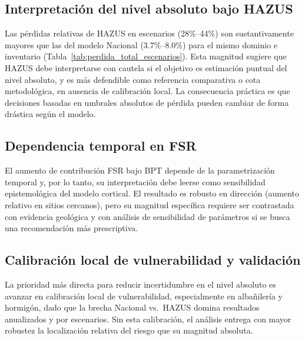 \subsection{Interpretación del nivel absoluto bajo HAZUS}
\label{subsubsec:lim_hazus}

Las pérdidas relativas de HAZUS en escenarios (28\%--44\%) son sustantivamente mayores que las del modelo Nacional (3.7\%--8.0\%) para el mismo dominio e inventario (Tabla~\ref{tab:perdida_total_escenarios}). Esta magnitud sugiere que HAZUS debe interpretarse con cautela si el objetivo es estimación puntual del nivel absoluto, y es más defendible como referencia comparativa o cota metodológica, en ausencia de calibración local. La consecuencia práctica es que decisiones basadas en umbrales absolutos de pérdida pueden cambiar de forma drástica según el modelo.

\subsection{Dependencia temporal en FSR}
\label{subsubsec:lim_bpt}

El aumento de contribución FSR bajo BPT depende de la parametrización temporal y, por lo tanto, su interpretación debe leerse como sensibilidad epistemológica del modelo cortical. El resultado es robusto en dirección (aumento relativo en sitios cercanos), pero su magnitud específica requiere ser contrastada con evidencia geológica y con análisis de sensibilidad de parámetros si se busca una recomendación más prescriptiva.


\subsection{Calibración local de vulnerabilidad y validación}
\label{subsubsec:proj_vuln}

La prioridad más directa para reducir incertidumbre en el nivel absoluto es avanzar en calibración local de vulnerabilidad, especialmente en albañilería y hormigón, dado que la brecha Nacional vs.\ HAZUS domina resultados anualizados y por escenarios. Sin esta calibración, el análisis entrega con mayor robustez la localización relativa del riesgo que su magnitud absoluta.
